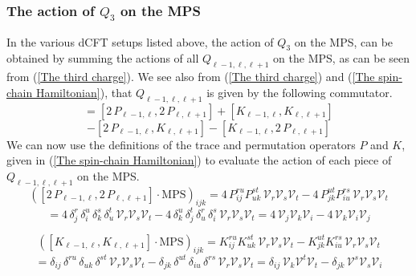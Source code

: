 \subsubsection{The action of $Q_3$ on the MPS}
In the various dCFT setups listed above, the action of $Q_3$ on the MPS, can be obtained by summing the actions of all $Q_{\ell-1,\ell,\ell+1}$ on the MPS, as can be seen from (\ref{The third charge}). We see also from (\ref{The third charge}) and (\ref{The spin-chain Hamiltonian}), that $Q_{\ell-1,\ell,\ell+1}$ is given by the following commutator.
%
%
\begin{equation*}
[H_{\ell-1,\ell}, H_{\ell, \ell+1}]
=
[2 \, P_{\ell-1,\ell}, 2 \, P_{\ell,\ell+1}]
+
[K_{\ell-1,\ell}, K_{\ell,\ell+1}]
\end{equation*}
%
%
\begin{equation}
-
[2 \, P_{\ell-1,\ell}, K_{\ell,\ell+1}]
-
[K_{\ell-1,\ell}, 2 \, P_{\ell,\ell+1}]
\end{equation}
%
%
We can now use the definitions of the trace and permutation operators $P$ and $K$, given in (\ref{The spin-chain Hamiltonian}) to evaluate the action of each piece of $Q_{\ell-1,\ell,\ell+1}$ on the MPS.
%
%
\begin{equation*}
([2 \, P_{\ell-1,\ell}, 2 \, P_{\ell,\ell+1}] \cdot \text{MPS})_{ijk}
=
4 \, P^{ru}_{ij} P^{st}_{uk} \, \mathcal{V}_r \mathcal{V}_s \mathcal{V}_t
-
4 \, P^{ut}_{jk} P^{rs}_{iu} \, \mathcal{V}_r \mathcal{V}_s \mathcal{V}_t
\end{equation*}
%
%
\begin{equation}
=
4 \, \delta^r_j \, \delta^u_i \, \delta^s_k \, \delta^t_u
\, \mathcal{V}_r \mathcal{V}_s \mathcal{V}_t
-
4 \, \delta^u_k \, \delta^t_j \, \delta^r_u \, \delta^s_i
\, \mathcal{V}_r \mathcal{V}_s \mathcal{V}_t
=
4 \, \mathcal{V}_j \mathcal{V}_k \mathcal{V}_i
-
4 \, \mathcal{V}_k \mathcal{V}_i \mathcal{V}_j
\end{equation}
%
%

%
%
\begin{equation*}
([K_{\ell-1,\ell}, K_{\ell,\ell+1}] \cdot \text{MPS})_{ijk}
=
K^{ru}_{ij} K^{st}_{uk} \, \mathcal{V}_r \mathcal{V}_s \mathcal{V}_t
-
K^{ut}_{jk} K^{rs}_{iu} \, \mathcal{V}_r \mathcal{V}_s \mathcal{V}_t
\end{equation*}
%
%
\begin{equation}
=
\delta_{ij} \, \delta^{ru} \, \delta_{uk} \, \delta^{st} \, \mathcal{V}_r \mathcal{V}_s \mathcal{V}_t
-
\delta_{jk} \, \delta^{ut} \, \delta_{iu} \, \delta^{rs} \, \mathcal{V}_r \mathcal{V}_s \mathcal{V}_t
=
\delta_{ij} \, \mathcal{V}_k \mathcal{V}^t \mathcal{V}_t
-
\delta_{jk} \, \mathcal{V}^s \mathcal{V}_s \mathcal{V}_i
\end{equation}
%
%

